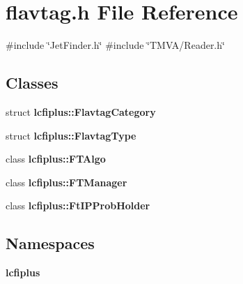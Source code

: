\section{flavtag.\+h File Reference}
\label{flavtag_8h}
{\ttfamily \#include \char`\"{}Jet\+Finder.\+h\char`\"{}}\newline
{\ttfamily \#include \char`\"{}T\+M\+V\+A/\+Reader.\+h\char`\"{}}\newline
\subsection*{Classes}
\begin{DoxyCompactItemize}
\item 
struct \textbf{ lcfiplus\+::\+Flavtag\+Category}
\item 
struct \textbf{ lcfiplus\+::\+Flavtag\+Type}
\item 
class \textbf{ lcfiplus\+::\+F\+T\+Algo}
\item 
class \textbf{ lcfiplus\+::\+F\+T\+Manager}
\item 
class \textbf{ lcfiplus\+::\+Ft\+I\+P\+Prob\+Holder}
\end{DoxyCompactItemize}
\subsection*{Namespaces}
\begin{DoxyCompactItemize}
\item 
 \textbf{ lcfiplus}
\end{DoxyCompactItemize}
